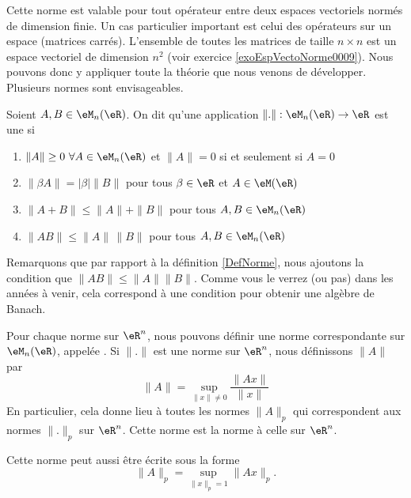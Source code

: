 Cette norme est valable pour tout opérateur entre deux espaces vectoriels normés de dimension finie. Un cas particulier important est celui des opérateurs sur un espace (matrices carrés). L'ensemble de toutes les matrices de taille \( n\times n\) est un espace vectoriel de dimension \( n^2\) (voir exercice \ref{exoEspVectoNorme0009}). Nous pouvons donc y appliquer toute la théorie que nous venons de développer. Plusieurs normes sont envisageables.

\begin{definition}
    Soient $A,B\in \eM_n(\eR)$. On dit qu'une application $\| . \|: \eM_n(\eR)\to\eR$ est une  si
\begin{enumerate}
\item $\| A \|\geq 0\ \forall A\in \eM_n(\eR)$ et $\| A \|=0$ si et seulement si $A=0$
\item $\| \beta A\|=| \beta |\|B\|$ pour tous $\beta\in\eR$ et \( A\in\eM(\eR)\)
\item $\|A+B\|\leq\|A\|+\|B\|$ pour tous $A,B\in \eM_n(\eR)$
\item $\|AB\|\leq\|A\|\, \|B\|$ pour tous $A,B\in \eM_n(\eR)$
\end{enumerate}
\end{definition}

Remarquons que par rapport à la définition \ref{DefNorme}, nous ajoutons la condition que \( \| AB \|\leq \| A \|\| B \|\). Comme vous le verrez (ou pas) dans les années à venir, cela correspond à une condition pour obtenir une algèbre de Banach.

\begin{example}     \label{ExemdefnormpMrt}
    Pour chaque norme sur \( \eR^n\), nous pouvons définir une norme correspondante sur \( \eM_n(\eR)\), appelée . Si \( \| . \|\) est une norme sur \( \eR^n\), nous définissons \( \| A \|\) par
    \begin{equation}
        \|A\|=\sup_{\|x\|\neq 0}\frac{\|Ax\|}{\|x\|}
    \end{equation}
    En particulier, cela donne lieu à toutes les normes \( \| A \|_p\) qui correspondent aux normes \( \| . \|_p\) sur \( \eR^n\). Cette norme est la norme  à celle sur \( \eR^n\).
\end{example}

\begin{lemma}
    Cette norme peut aussi être écrite sous la forme
    \begin{equation}
        \| A \|_p=\sup_{\|x\|_p=1}\|Ax\|_p.
    \end{equation}
\end{lemma}

